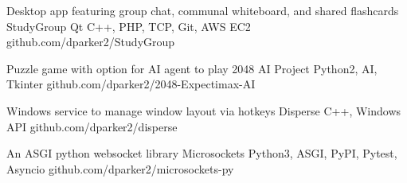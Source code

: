 \documentclass[]{awesome-cv}
\begin{document}
\begin{cventries}
	\cventry
	{Desktop app featuring group chat, communal whiteboard, and shared flashcards}
	{StudyGroup}
	{Qt C++, PHP, TCP, Git, AWS EC2}
	{github.com/dparker2/StudyGroup}
	{}

	\vspace{-5mm}
	\cventry
	{Puzzle game with option for AI agent to play}
	{2048 AI Project}
	{Python2, AI, Tkinter}
	{github.com/dparker2/2048-Expectimax-AI}
	{}

	\vspace{-5mm}
	\cventry
	{Windows service to manage window layout via hotkeys}
	{Disperse}
	{C++, Windows API}
	{github.com/dparker2/disperse}
	{}

	\vspace{-5mm}
	\cventry
	{An ASGI python websocket library}
	{Microsockets}
	{Python3, ASGI, PyPI, Pytest, Asyncio}
	{github.com/dparker2/microsockets-py}
	{}
	
	\vspace{-5mm}
\end{cventries}

\ 
\end{document}
